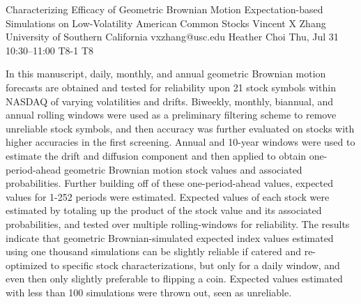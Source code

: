 \documentclass[12pt,lettersize,oneside]{book} %
\begin{document}
\begin{talk}
  {Characterizing Efficacy of Geometric Brownian Motion Expectation-based Simulations on Low-Volatility American Common Stocks}%
  {Vincent X Zhang}%
  {University of Southern California}%
  {vxzhang@usc.edu}%
  {Heather Choi}%
  {}%
  {Thu, Jul 31 10:30--11:00}%
  {T8-1}%
  {T8}%
  
    
   
In this manuscript, daily, monthly, and annual geometric Brownian motion forecasts are obtained and tested for reliability upon 21 stock symbols within NASDAQ of varying volatilities and drifts. Biweekly, monthly, biannual, and annual rolling windows were used as a preliminary filtering scheme to remove unreliable stock symbols, and then accuracy was further evaluated on stocks with higher accuracies in the first screening. Annual and 10-year windows were used to estimate the drift and diffusion component and then applied to obtain one-period-ahead geometric Brownian motion stock values and associated probabilities. Further building off of these one-period-ahead values, expected values for 1-252 periods were estimated. Expected values of each stock were estimated by totaling up the product of the stock value and its associated probabilities, and tested over multiple rolling-windows for reliability. The results indicate that geometric Brownian-simulated expected index values estimated using one thousand simulations can be slightly reliable if catered and re-optimized to specific stock characterizations, but only for a daily window, and even then only slightly preferable to flipping a coin. Expected values estimated with less than 100 simulations were thrown out, seen as unreliable.


\medskip


\end{talk}
\end{document}
